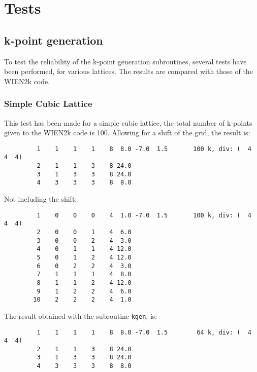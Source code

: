 \section{Tests}


\subsection{k-point generation}

To test the reliability of the k-point generation subroutines, several
tests have been performed, for various lattices. The results are compared
with those of the WIEN2k code.

\subsubsection{Simple Cubic Lattice}

This test has been made for a simple cubic lattice, the total number of
k-points given to the WIEN2k code is 100. Allowing for a shift of the
grid, the result is:

\begin{verbatim}
         1    1    1    1    8  8.0 -7.0  1.5       100 k, div: (  4  4  4)
         2    1    1    3    8 24.0
         3    1    3    3    8 24.0
         4    3    3    3    8  8.0
\end{verbatim}

Not including the shift:

\begin{verbatim}
         1    0    0    0    4  1.0 -7.0  1.5       100 k, div: (  4  4  4)
         2    0    0    1    4  6.0
         3    0    0    2    4  3.0
         4    0    1    1    4 12.0
         5    0    1    2    4 12.0
         6    0    2    2    4  3.0
         7    1    1    1    4  8.0
         8    1    1    2    4 12.0
         9    1    2    2    4  6.0
        10    2    2    2    4  1.0
\end{verbatim}

The result obtained with the subroutine \verb"kgen", is:

\begin{verbatim}
         1    1    1    1    8  8.0 -7.0  1.5        64 k, div: (  4  4  4)
         2    1    1    3    8 24.0
         3    1    3    3    8 24.0
         4    3    3    3    8  8.0
\end{verbatim}

